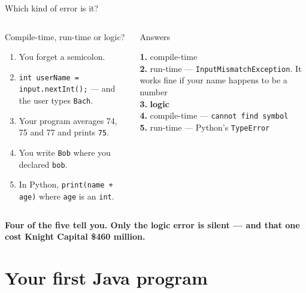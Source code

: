 \documentclass[aspectratio=169]{beamer}
\newcommand{\keyline}[1]{\vfill\begin{center}\textcolor{bkblue}{\textbf{#1}}\end{center}\vspace*{0.2em}}
\newcommand{\code}[1]{\texttt{#1}}
\begin{document}
\begin{frame}{Which kind of error is it?}
  \begin{columns}[T,onlytextwidth]
    \begin{discussionbox}{Compile-time, run-time or logic?}
      \small
      \begin{enumerate}[itemsep=0.35em, leftmargin=1.3em]
        \item You forget a semicolon.
        \item \code{int userName = input.nextInt();} --- and the user types \code{Bach}.
        \item Your program averages 74, 75 and 77 and prints \code{75}.
        \item You write \code{Bob} where you declared \code{bob}.
        \item In Python, \code{print(name + age)} where \code{age} is an \code{int}.
      \end{enumerate}
    \end{discussionbox}
    \pause
    \begin{contextbox}{Answers}
      \small\raggedright
      \textbf{1.} compile-time\\[0.2em]
      \textbf{2.} run-time --- \code{InputMismatchException}. It works fine if your name
      happens to be a number\\[0.2em]
      \textbf{3.} \textcolor{badred}{\textbf{logic}}\\[0.2em]
      \textbf{4.} compile-time --- \code{cannot find symbol}\\[0.2em]
      \textbf{5.} run-time --- Python's \code{TypeError}
    \end{contextbox}
  \end{columns}
  \keyline{Four of the five tell you. Only the logic error is silent --- and that one cost
  Knight Capital \$460 million.}
\end{frame}

\section{Your first Java program}
\end{document}
